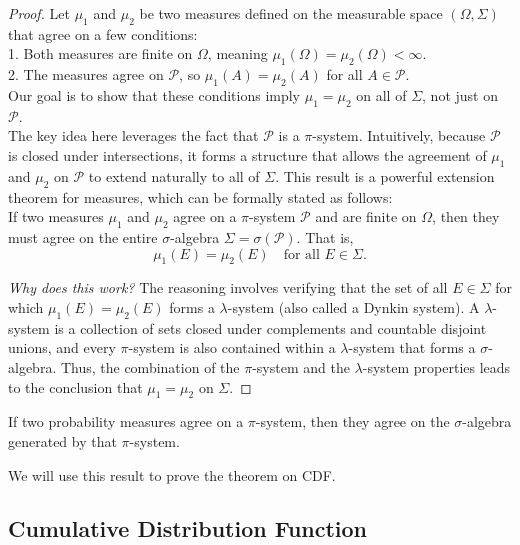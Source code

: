 \begin{proof}
Let $\mu_1$ and $\mu_2$ be two measures defined on the measurable space $(\Omega, \Sigma)$ that agree on a few conditions:\\

1. Both measures are finite on $\Omega$, meaning $\mu_1(\Omega) = \mu_2(\Omega) < \infty$.\\
2. The measures agree on $\mathcal{P}$, so $\mu_1(A) = \mu_2(A)$ for all $A \in \mathcal{P}$.\\

Our goal is to show that these conditions imply $\mu_1 = \mu_2$ on all of $\Sigma$, not just on $\mathcal{P}$.\\

The key idea here leverages the fact that $\mathcal{P}$ is a $\pi$-system. Intuitively, because $\mathcal{P}$ is closed under intersections, it forms a structure that allows the agreement of $\mu_1$ and $\mu_2$ on $\mathcal{P}$ to extend naturally to all of $\Sigma$. This result is a powerful extension theorem for measures, which can be formally stated as follows:\\

If two measures $\mu_1$ and $\mu_2$ agree on a $\pi$-system $\mathcal{P}$ and are finite on $\Omega$, then they must agree on the entire $\sigma$-algebra $\Sigma = \sigma(\mathcal{P})$. That is,
\[
\mu_1(E) = \mu_2(E) \quad \text{for all } E \in \Sigma.
\]

\textit{Why does this work?} The reasoning involves verifying that the set of all $E \in \Sigma$ for which $\mu_1(E) = \mu_2(E)$ forms a $\lambda$-system (also called a Dynkin system). A $\lambda$-system is a collection of sets closed under complements and countable disjoint unions, and every $\pi$-system is also contained within a $\lambda$-system that forms a $\sigma$-algebra. Thus, the combination of the $\pi$-system and the $\lambda$-system properties leads to the conclusion that $\mu_1 = \mu_2$ on $\Sigma$.
\end{proof}

\begin{corollary}
    If two probability measures agree on a $\pi$-system, then they agree on the $\sigma$-algebra generated by that $\pi$-system.
\end{corollary}

We will use this result to prove the theorem on CDF.

\subsection{Cumulative Distribution Function}

